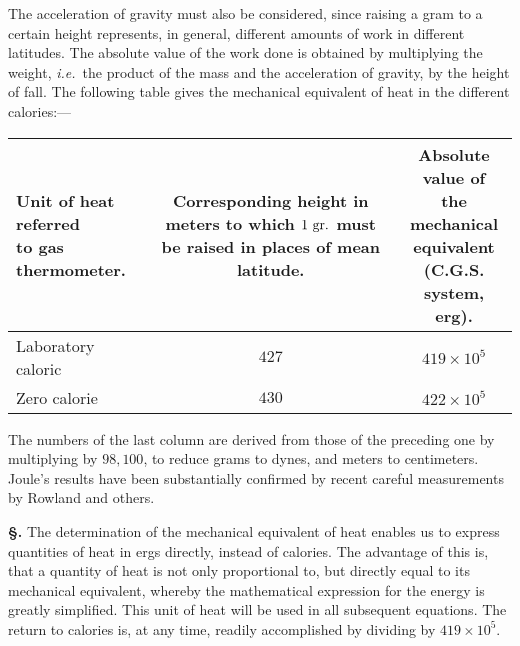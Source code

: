 \documentclass[12pt]{book}[2005/09/16]
\newlength{\TmpLen}
\newcommand{\TableFont}{\footnotesize}%
\newcommand{\ColumnHeading}[2]{%
  \settowidth{\TmpLen}{#1}%
  \parbox[c]{\TmpLen}{\centering\medskip #2\medskip}%
}
\newcommand{\Strut}[1][12pt]{\rule{0pt}{#1}}
\newcommand{\Section}[1]{
  \medskip\par\textbf{§\;#1}
  \label{section:#1}
}
\newcommand{\ie}{\emph{i.e.}}
\newcommand{\Unit}[1]{\text{\upshape #1}}
\begin{document}
The acceleration of gravity must also be considered,
since raising a gram to a certain height represents, in
general, different amounts of work in different latitudes.
The absolute value of the work done is obtained by multiplying
the weight, \ie\ the product of the mass and the
acceleration of gravity, by the height of fall. The following
table gives the mechanical equivalent of heat in the
%
different calories:---
\begin{center}
\TableFont
\begin{tabular}{l|c|c}
\hline
\ColumnHeading{Unit of heat referred}{Unit of heat referred \\
to gas thermometer.}
&
\ColumnHeading{Corresponding height in}{Corresponding height in \\
meters to which $1~\Unit{gr.}$ \\
must be raised in places
of mean latitude.}
&
\ColumnHeading{equivalent (C.G.S.)}{Absolute value of \\
the mechanical \\
equivalent (C.G.S. \\
system, erg).} \\
\hline
\Strut
Laboratory caloric & $427$ & $419 × 10^{5}$ \\
Zero calorie & $430$ & $422 × 10^{5}$ \\
\hline
\end{tabular}
\end{center}

The numbers of the last column are derived from those
of the preceding one by multiplying by $98,100$, to reduce
grams to dynes, and meters to centimeters. Joule's results
have been substantially confirmed by recent careful measurements
%
by Rowland and others.

\Section{62.} The determination of the mechanical equivalent
of heat enables us to express quantities of heat in ergs
directly, instead of calories. The advantage of this is, that
a quantity of heat is not only proportional to, but directly
equal to its mechanical equivalent, whereby the mathematical
expression for the energy is greatly simplified.
This unit of heat will be used in all subsequent equations.
The return to calories is, at any time, readily accomplished
by dividing by $419 × 10^{5}$.
\end{document}
